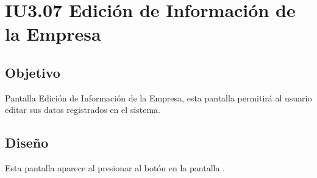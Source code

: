 \newpage
\section{IU3.07 Edición de Información de la Empresa}

\subsection{Objetivo}
	Pantalla Edición de Información de la Empresa, esta pantalla permitirá al usuario editar sus datos registrados en el sistema.
	


\subsection{Diseño}
	Esta pantalla aparece al presionar al botón  en la pantalla  .

	
